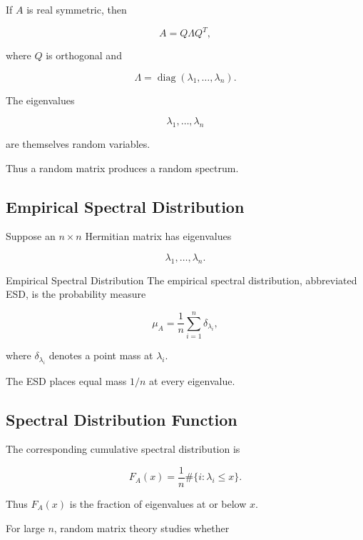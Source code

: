 If \(A\) is real symmetric, then

\[
\boxed{
A
=
Q\Lambda Q^T,
}
\]

where \(Q\) is orthogonal and

\[
\Lambda
=
\operatorname{diag}
(
\lambda_1,\ldots,\lambda_n
).
\]

The eigenvalues

\[
\lambda_1,\ldots,\lambda_n
\]

are themselves random variables.

Thus a random matrix produces a random spectrum.

\subsection{Empirical Spectral Distribution}
\label{subsec:empirical-spectral-distribution}

Suppose an \(n\times n\) Hermitian matrix has eigenvalues

\[
\lambda_1,\ldots,\lambda_n.
\]

\begin{definitionbox}{Empirical Spectral Distribution}
The empirical spectral distribution, abbreviated ESD, is the probability
measure

\[
\boxed{
\mu_A
=
\frac1n
\sum_{i=1}^{n}
\delta_{\lambda_i},
}
\]

where \(\delta_{\lambda_i}\) denotes a point mass at \(\lambda_i\).
\end{definitionbox}

The ESD places equal mass \(1/n\) at every eigenvalue.

\subsection{Spectral Distribution Function}
\label{subsec:spectral-distribution-function}

The corresponding cumulative spectral distribution is

\[
\boxed{
F_A(x)
=
\frac1n
\#\{i:\lambda_i\leq x\}.
}
\]

Thus \(F_A(x)\) is the fraction of eigenvalues at or below \(x\).

For large \(n\), random matrix theory studies whether

